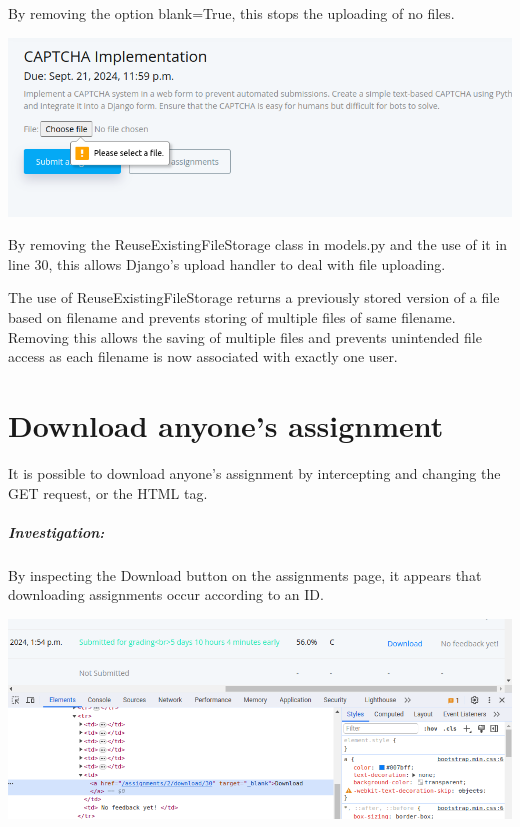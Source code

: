 By removing the option blank=True, this stops the uploading of no files.

\begin{center}
    \includegraphics[width = \linewidth]{images/Michelle/needsfile.png}
\end{center}

By removing the ReuseExistingFileStorage class in models.py and the use of it in line 30, this allows Django's upload handler to deal with file uploading.

The use of ReuseExistingFileStorage returns a previously stored version of a file based on filename and prevents storing of multiple files of same filename. Removing this allows the saving of multiple files and prevents unintended file access as each filename is now associated with exactly one user.

\section{Download anyone's assignment}

It is possible to download anyone's assignment by intercepting and changing the GET request, or the HTML tag.

\subparagraph{Investigation:}

By inspecting the Download button on the assignments page, it appears that downloading assignments occur according to an ID.

\begin{center}
    \includegraphics[width = \linewidth]{images/Michelle/downloadlink.png}
\end{center}

